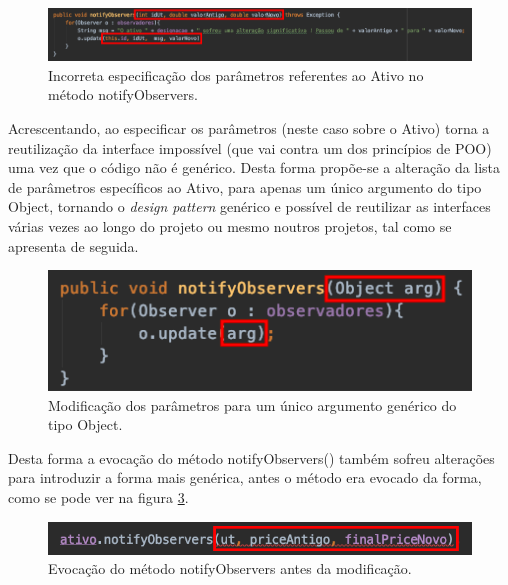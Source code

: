 \begin{figure}[H]
	\centering
	\includegraphics[scale=0.55]{images/design_pattern_observer_before.png}
	\caption{Incorreta especificação dos parâmetros referentes ao Ativo no método notifyObservers.}
	\label{img:pag}
\end{figure}

\hspace{5mm} Acrescentando, ao especificar os parâmetros (neste caso sobre o Ativo) torna a reutilização da interface impossível (que vai contra um dos princípios de POO) uma vez que o código não é genérico. Desta forma propõe-se a alteração da lista de parâmetros específicos ao Ativo, para apenas um único argumento do tipo Object, tornando o \emph{design pattern} genérico e possível de reutilizar as interfaces várias vezes ao longo do projeto ou mesmo noutros projetos, tal como se apresenta de seguida. 

\begin{figure}[H]
	\centering
	\includegraphics[scale=0.55]{images/design_pattern_observer_after_1.png}
	\caption{Modificação dos parâmetros para um único argumento genérico do tipo Object.}
	\label{img:pag}
\end{figure}

\hspace{5mm} Desta forma a evocação do método notifyObservers() também sofreu alterações para introduzir a forma mais genérica, antes o método era evocado da forma, como se pode ver na figura \ref{img:pag1}.

\begin{figure}[H]
	\centering
	\includegraphics[scale=0.55]{images/design_pattern_observer_before_2.png}
	\caption{Evocação do método notifyObservers antes da modificação.}
	\label{img:pag1}
\end{figure}

